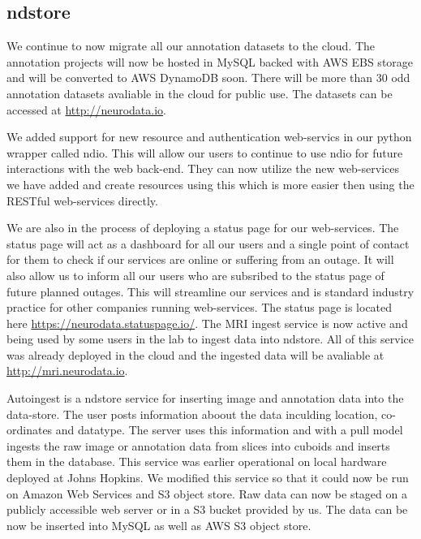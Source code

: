 \documentclass[simplex.tex]{subfiles}
\begin{document}
\subsection{ndstore}

We continue to now migrate all our annotation datasets to the cloud. The annotation projects will now be hosted in MySQL backed with AWS EBS storage and will be converted to AWS DynamoDB soon. There will be more than 30 odd annotation datasets avaliable in the cloud for public use. The datasets can be accessed at \href{http://neurodata.io}{http://neurodata.io}.

We added support for new resource and authentication web-servics in our python wrapper called ndio. This will allow our users to continue to use ndio for future interactions with the web back-end. They can now utilize the new web-services we have added and create resources using this which is more easier then using the RESTful web-services directly.

We are also in the process of deploying a status page for our web-services. The status page will act as a dashboard for all our users and a single point of contact for them to check if our services are online or suffering from an outage. It will also allow us to inform all our users who are subsribed to the status page of future planned outages. This will streamline our services and is standard industry practice for other companies running web-services. The status page is located here \href{https://neurodata.statuspage.io/}{https://neurodata.statuspage.io/}.
%
The MRI ingest service is now active and being used by some users in the lab to ingest data into ndstore. All of this service was already deployed in the cloud and the ingested data will be avaliable at \href{http://mri.neurodata.io}{http://mri.neurodata.io}.


Autoingest is a ndstore service for inserting image and annotation data into the data-store. The user posts information aboout the data inculding location, co-ordinates and datatype. The server uses this information and with a pull model ingests the raw image or annotation data from slices into cuboids and inserts them in the database. This service was earlier operational on local hardware deployed at Johns Hopkins. We modified this service so that it could now be run on Amazon Web Services and S3 object store. Raw data can now be staged on a publicly accessible web server or in a S3 bucket provided by us. The data can be now be inserted into MySQL as well as AWS S3 object store. \par
\end{document}
